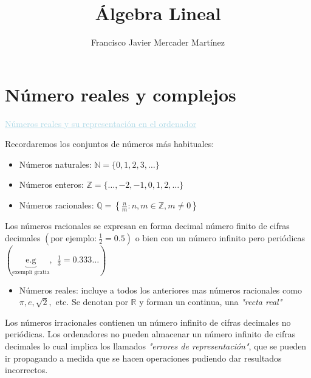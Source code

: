 \documentclass[12pt]{article}
\title{Álgebra Lineal}
\author{Francisco Javier Mercader Martínez}
\date{}
\begin{document}
\maketitle
\tableofcontents

\section{Número reales y complejos}

\textcolor{lightblue}{\underline{Números reales y su
representación en el ordenador}}

Recordaremos los conjuntos de números más habituales:
\begin{itemize}
    \item Números naturales: $\mathbb{N}=\{0,1,2,3,\hdots\}$
\item Números enteros:
$\mathbb{Z}=\{\hdots,-2,-1,0,1,2,\hdots\}$
\item Números racionales:
$\mathbb{Q}=\left\{\frac{n}{m}:n,m\in\mathbb{Z},m\neq0\right\}$
\end{itemize}
Los números racionales se expresan en forma decimal número
finito de cifras decimales $\left(\text{por
ejemplo:}~\frac{1}{2}=0.5\right)$ o bien con un número infinito
pero periódicas $\left(\underbrace{\text{e.g}}_{\text{exempli
gratia}},~~\frac{1}{3}=0.333\hdots\right)$
\begin{itemize}
\item Números reales: incluye a todos los anteriores mas números
racionales como $\pi,e,\sqrt{2},$ etc. Se denotan por
$\mathbb{R}$ y forman un continua, una \textit{"recta real"}
\end{itemize}
\begin{center}
\end{center}
Los números irracionales contienen un número infinito de cifras
decimales no periódicas. Los ordenadores no pueden almacenar un
número infinito de cifras decimales lo cual implica los llamados
\textit{"errores de representación"}, que se pueden ir
propagando a medida que se hacen operaciones pudiendo dar
resultados incorrectos.
\end{document}
